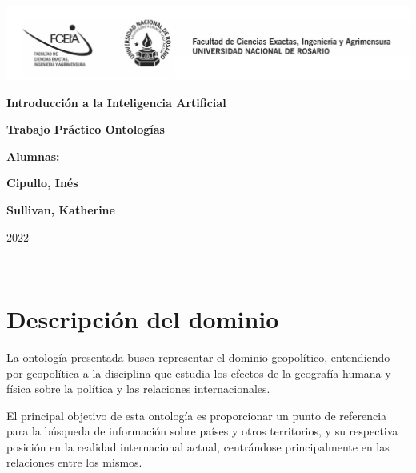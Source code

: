 \documentclass[11pt]{article}
\begin{document}
\begin{titlepage}
    \hspace{-2.5cm}\includegraphics[scale= 0.48]{header.png}
    \begin{center}
        \vfill
            \noindent\textbf{\Huge Introducción a la Inteligencia Artificial}\par
            \vspace{.5cm}
            \noindent\textbf{\Huge Trabajo Práctico Ontologías}\par
            \vspace{.5cm}
        \vfill
        \noindent \textbf{\huge Alumnas:}\par
        \vspace{.5cm}
        \noindent \textbf{\Large Cipullo, Inés}\par
        \noindent \textbf{\Large Sullivan, Katherine}\par
 
        \vfill
        \noindent\large 2022
    \end{center}
\end{titlepage}
\ 

\section{Descripción del dominio}
La ontología presentada busca representar el dominio geopolítico, entendiendo por geopolítica a la disciplina que estudia los efectos de la geografía humana y física sobre la política y las relaciones internacionales.

El principal objetivo de esta ontología es proporcionar un punto de referencia para la búsqueda de información sobre países y otros territorios, y su respectiva posición en la realidad internacional actual, centrándose principalmente en las relaciones entre los mismos. 
\end{document}
